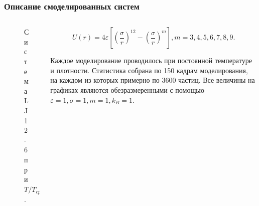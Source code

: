 \documentclass[pdf,hyperref={unicode}]{beamer}
\begin{document}
\begin{frame}
\transdissolve[duration=0.2]
\frametitle{Описание смоделированных систем}

\begin{columns}

\begin{column}{0.45\linewidth}
\begin{figure}[h]

\caption{\tiny Система LJ 12-6 при $T / T_{cp} = 0.95$.}
\end{figure}
\end{column}

\begin{column}{0.5\linewidth}
\tiny{

\begin{equation}
U(r) = 4\varepsilon \left[ \left(\frac{\sigma}{r}\right)^{12} - \left(\frac{\sigma}{r}\right)^{m} \right], m = 3, 4, 5, 6, 7, 8, 9.
\label{eqLJ}
\end{equation}

Каждое моделирование проводилось при постоянной температуре и плотности. Статистика собрана по 150 кадрам моделирования, на каждом из которых примерно по 3600 частиц. Все величины на графиках являются обезразмеренными с помощью $\varepsilon = 1, \sigma = 1, m = 1, k_B = 1$.

}
\end{column}
\end{columns}
\end{frame}
\end{document}
